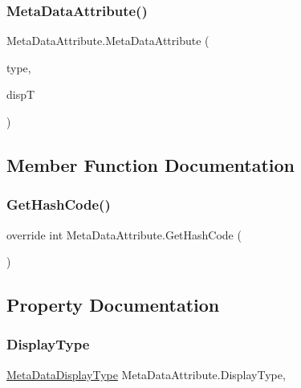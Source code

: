 \subsubsection{\texorpdfstring{Meta\+Data\+Attribute()}{MetaDataAttribute()}}
{\footnotesize\ttfamily Meta\+Data\+Attribute.\+Meta\+Data\+Attribute (\begin{DoxyParamCaption}\item[{string}]{type,  }\item[{\mbox{\hyperlink{class_meta_data_attribute_a6ee5864d9fdea1bf498aa2d4b529af41}{Meta\+Data\+Display\+Type}}}]{dispT }\end{DoxyParamCaption})}



\subsection{Member Function Documentation}
\mbox{\label{class_meta_data_attribute_a8be44bd8123e36e30662fc1d1c0b99c8}} 
\subsubsection{\texorpdfstring{Get\+Hash\+Code()}{GetHashCode()}}
{\footnotesize\ttfamily override int Meta\+Data\+Attribute.\+Get\+Hash\+Code (\begin{DoxyParamCaption}{ }\end{DoxyParamCaption})}



\subsection{Property Documentation}
\mbox{\label{class_meta_data_attribute_ad1a7f54c9fc93b7b7ceeedee16419a6c}} 
\subsubsection{\texorpdfstring{Display\+Type}{DisplayType}}
{\footnotesize\ttfamily \mbox{\hyperlink{class_meta_data_attribute_a6ee5864d9fdea1bf498aa2d4b529af41}{Meta\+Data\+Display\+Type}} Meta\+Data\+Attribute.\+Display\+Type\hspace{0.3cm}{\ttfamily [get]}, {}}

